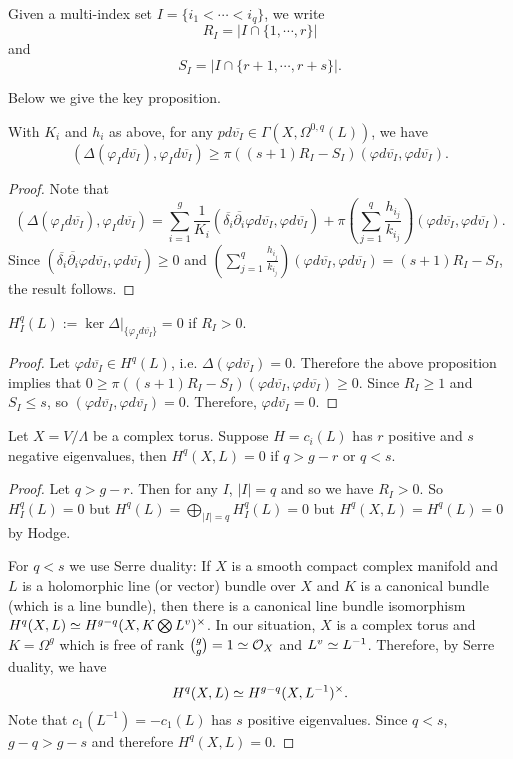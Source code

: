 Given a multi-index set $I=\{i_1<\cdots <i_q\}$, we write 
$$R_I=|I\cap \{1,\cdots, r\}|$$
and 
$$S_I=|I\cap \{r+1,\cdots, r+s\}|.$$

Below we give the key proposition.

\begin{proposition}
With $K_i$ and $h_i$ as above, for any $pd\overline{v_I}\in \Gamma(X,\Omega^{0,q}(L))$, we have 
$$(\Delta(\varphi_Id\overline{v_I}),\varphi_Id\overline{v_I})\geq \pi((s+1)R_I-S_I)(\varphi d\overline{v_I},\varphi d\overline{v_I}).$$
\end{proposition}
\begin{proof}
Note that
$$(\Delta(\varphi_Id\overline{v_I}),\varphi_Id\overline{v_I})=\sum_{i=1}^g \frac{1}{K_i}(\overline{\delta_i}\overline{\partial_i}\varphi d\overline{v_I},\varphi d\overline{v_I})+\pi(\sum_{j=1}^q \frac{h_{i_j}}{k_{i_j}})(\varphi d\overline{v_I},\varphi d \overline{v_I}).$$
Since $(\overline{\delta_i}\overline{\partial_i}\varphi d\overline{v_I},\varphi d\overline{v_I})\geq 0$ and 
$(\sum_{j=1}^q \frac{h_{i_j}}{k_{i_j}})(\varphi d\overline{v_I},\varphi d \overline{v_I})=(s+1)R_I-S_I$, the result follows.
\end{proof}

\begin{corollary}
$H_I^q(L):=\ker\Delta|_{\{\varphi_I d\overline{v_I}\}}=0$ if $R_I>0$. 
\end{corollary}
\begin{proof}
Let $\varphi d\overline{v_I}\in H^q(L)$, i.e. $\Delta(\varphi d\overline{v_I})=0$. Therefore the above proposition implies that $0\geq \pi((s+1)R_I-S_I)(\varphi d\overline{v_I},\varphi d\overline{v_I})\geq 0$. Since $R_I\geq 1$ and $S_I\leq s$, so $(\varphi d\overline{v_I},\varphi d\overline{v_I})=0$. Therefore, $\varphi d\overline{v_I}=0$.
\end{proof}

\begin{theorem}
Let $X=V/\Lambda$ be a complex torus. Suppose $H=c_i(L)$ has $r$ positive and $s$ negative eigenvalues, then $H^q(X,L)=0$ if $q>g-r$ or $q<s$. 
\end{theorem}

\begin{proof}
Let $q>g-r$. Then for any $I$, $|I|=q$ and so we have $R_I>0$. So $H_I^q(L)=0$ but $H^q(L)=\bigoplus_{|I|=q} H_I^q(L)=0$ but $H^q(X,L)=H^q(L)=0$ by Hodge.

For $q<s$ we use Serre duality: If $X$ is a smooth compact complex manifold and $L$ is a holomorphic line (or vector) bundle over $X$ and $K$ is a canonical bundle (which is a line bundle), then there is a canonical line bundle isomorphism $H^q(X,L)\simeq H^{g-q}(X,K\bigotimes L^v)^\times$. 
In our situation, $X$ is a complex torus and $K=\Omega^g$ which is free of rank $\binom{g}{g}=1\simeq \mathcal{O}_X$ and $L^v\simeq L^{-1}$. Therefore, by Serre duality, we have 
$$H^q(X,L)\simeq H^{g-q}(X,L^{-1})^\times.$$
Note that $c_1(L^{-1})=-c_1(L)$ has $s$ positive eigenvalues. Since $q<s$, $g-q>g-s$ and therefore $H^q(X,L)=0$.  
\end{proof}

